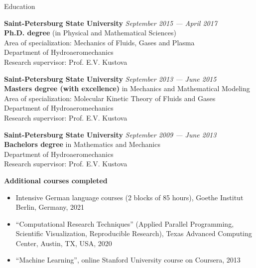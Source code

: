 \documentclass{resume} %
\begin{document}
\newpage

\begin{rSection}{Education}

{\bf Saint-Petersburg State University} \hfill {\em September 2015 --- April 2017} \\ 
\textbf{Ph.D. degree} (in Physical and Mathematical Sciences)\\
Area of specialization: Mechanics of Fluids, Gases and Plasma \smallskip  \\
Department of Hydroaeromechanics \\
Research supervisor: Prof. E.V. Kustova

{\bf Saint-Petersburg State University} \hfill {\em September 2013 --- June 2015} \\ 
\textbf{Masters degree (with excellence)} in Mechanics and Mathematical Modeling\\
Area of specialization: Molecular Kinetic Theory of Fluids and Gases\smallskip \\
Department of Hydroaeromechanics \\
Research supervisor: Prof. E.V. Kustova 

{\bf Saint-Petersburg State University} \hfill {\em September 2009 --- June 2013} \\ 
\textbf{Bachelors degree} in Mathematics and Mechanics \smallskip \\
Department of Hydroaeromechanics \\
Research supervisor: Prof. E.V. Kustova
\end{rSection}

{\bf Additional courses completed}
\begin{itemize}
    \item Intensive German language courses (2 blocks of 85 hours), Goethe Institut Berlin, Germany, 2021
    \item ``Computational Research Techniques'' (Applied Parallel Programming, Scientific Visualization, Reproducible Research), Texas Advanced Computing Center, Austin, TX, USA, 2020
    \item ``Machine Learning'', online Stanford University course on Coursera, 2013
\end{itemize}
\end{document}
